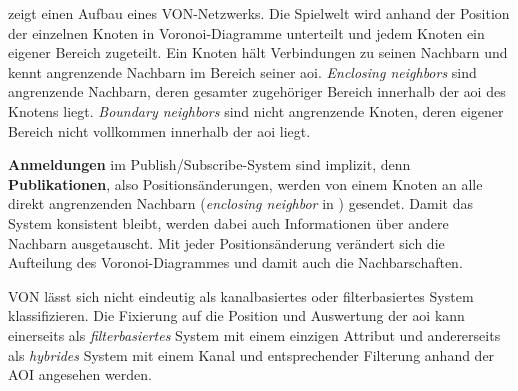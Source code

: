  zeigt einen Aufbau eines VON-Netzwerks. Die Spielwelt wird anhand der Position der einzelnen Knoten in Voronoi-Diagramme \cite{Aurenhammer1991Voronoi} unterteilt und jedem Knoten ein eigener Bereich zugeteilt. Ein Knoten hält Verbindungen zu seinen Nachbarn und kennt angrenzende Nachbarn im Bereich seiner \ac{aoi}. \emph{Enclosing neighbors} sind angrenzende Nachbarn, deren gesamter zugehöriger Bereich innerhalb der \ac{aoi} des Knotens liegt. \emph{Boundary neighbors} sind nicht angrenzende Knoten, deren eigener Bereich nicht vollkommen innerhalb der \ac{aoi} liegt.

\textbf{Anmeldungen} im Publish/Subscribe-System sind implizit, denn \textbf{Publikationen}, also Positionsänderungen, werden von einem Knoten an alle direkt angrenzenden Nachbarn (\emph{enclosing neighbor} in ) gesendet. Damit das System konsistent bleibt, werden dabei auch Informationen über andere Nachbarn ausgetauscht. Mit jeder Positionsänderung verändert sich die Aufteilung des Voronoi-Diagrammes und damit auch die Nachbarschaften.

VON lässt sich nicht eindeutig als kanalbasiertes oder filterbasiertes System klassifizieren. Die Fixierung auf die Position und Auswertung der \ac{aoi} kann einerseits als \emph{filterbasiertes} System mit einem einzigen Attribut und andererseits als \emph{hybrides} System mit einem  Kanal und entsprechender Filterung anhand der AOI angesehen werden.

